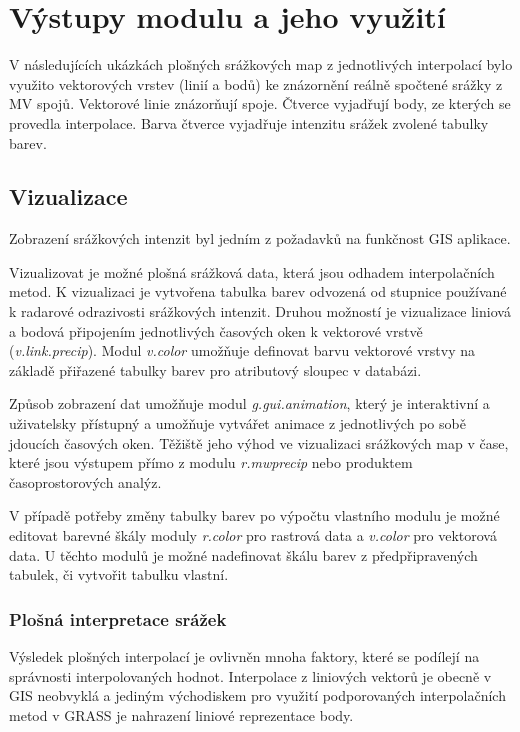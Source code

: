 \documentclass[a4paper,12pt,oneside]{report}
\begin{document}
\newpage
\setcounter{footnote}{1}
\section{Výstupy modulu a jeho využití}

V následujících ukázkách plošných srážkových map z jednotlivých
interpolací bylo využito vektorových vrstev (linií a bodů) ke
znázornění reálně spočtené srážky z MV spojů. Vektorové linie
znázorňují spoje. Čtverce vyjadřují body, ze kterých se provedla
interpolace. Barva čtverce vyjadřuje intenzitu srážek zvolené tabulky
barev.


\subsection{Vizualizace}
Zobrazení srážkových intenzit byl jedním z požadavků na funkčnost GIS
aplikace.

Vizualizovat je možné plošná srážková data, která jsou odhadem
interpolačních metod. K vizualizaci je vytvořena tabulka barev
odvozená od stupnice používané k radarové odrazivosti srážkových
intenzit. Druhou možností je vizualizace liniová a bodová připojením
jednotlivých časových oken k vektorové vrstvě
(\textit{v.link.precip}). Modul \textit{v.color} umožňuje definovat
barvu vektorové vrstvy na základě přiřazené tabulky barev pro
atributový sloupec v databázi.

Způsob zobrazení dat umožňuje modul \textit{g.gui.animation}, který je
interaktivní a uživatelsky přístupný a umožňuje vytvářet animace z
jednotlivých po sobě jdoucích časových oken. Těžiště jeho výhod ve 
vizualizaci srážkových map v čase, které jsou výstupem přímo z modulu
\textit{r.mwprecip} nebo produktem časoprostorových analýz.

V případě potřeby změny tabulky barev po výpočtu vlastního modulu je
možné editovat barevné škály moduly \textit{r.color} pro rastrová data
a \textit{v.color} pro vektorová data. U těchto modulů je možné
nadefinovat škálu barev z předpřipravených tabulek, či vytvořit
tabulku vlastní.

\subsubsection{Plošná interpretace srážek}
Výsledek plošných interpolací je ovlivněn mnoha faktory, které se
podílejí na správnosti interpolovaných hodnot.  Interpolace z
liniových vektorů je obecně v GIS neobvyklá a jediným východiskem pro
využití podporovaných interpolačních metod v GRASS je nahrazení
liniové reprezentace body.
\end{document}
